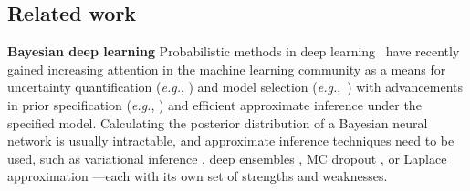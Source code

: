 \documentclass{article}
\makeatletter
\newcommand{\eg}{\textit{e.g.\@}\xspace}
\makeatother
\begin{document}
\subsection{Related work}
\label{sec:related}
%
\textbf{Bayesian deep learning}
Probabilistic methods in deep learning~\cite{Wilson:ensembles,neal1995bayesian} have recently gained increasing attention in the machine learning community as a means for uncertainty quantification (\eg, \cite{kendall2017what,wilson2020bayes}) and model selection (\eg,~\cite{immer2021scalable,antoran2022marginal}) with advancements in prior specification (\eg, \cite{cho2009kernel,meronen2020stationary,meronen2021periodic,fortuin2021bayesian,nalisnick2018do}) and efficient approximate inference under the specified model.
Calculating the posterior distribution of a Bayesian neural network is usually intractable, and approximate inference techniques need to be used, such as variational inference \cite{blei2017variational}, deep ensembles \cite{lakshminarayanan2017simple}, MC dropout \cite{gal2016dropout}, or Laplace approximation \cite{ritter2018kfac,kristiadi2020being,immer2021improving}---each with its own set of strengths and weaknesses.


\end{document}
